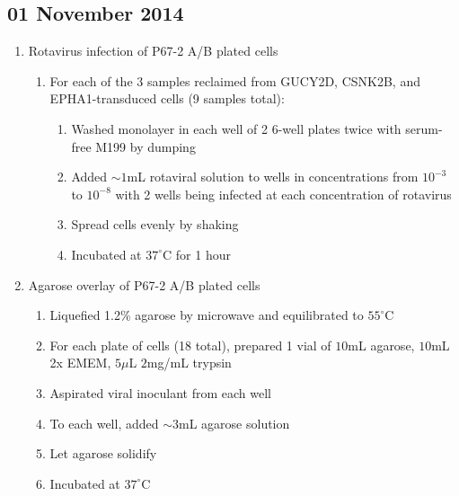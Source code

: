 \subsection*{01 November 2014}

\begin{enumerate}
	\item Rotavirus infection of P67-2 A/B plated cells
		\begin{enumerate}
			\item For each of the 3 samples reclaimed from GUCY2D, CSNK2B, and EPHA1-transduced cells (9 samples total):
				\begin{enumerate}
					\item Washed monolayer in each well of 2 6-well plates twice with serum-free M199 by dumping
					\item Added $\sim 1$mL rotaviral solution to wells in concentrations from $10^{-3}$ to $10^{-8}$ with 2 wells being infected at each concentration of rotavirus
					\item Spread cells evenly by shaking
					\item Incubated at $37^{\circ}$C for 1 hour
				\end{enumerate}
		\end{enumerate}
	\item Agarose overlay of P67-2 A/B plated cells
		\begin{enumerate}
			\item Liquefied 1.2\% agarose by microwave and equilibrated to $55^{\circ}$C
			\item For each plate of cells (18 total), prepared 1 vial of $10$mL agarose, $10$mL 2x EMEM, $5\mu$L $2$mg/mL trypsin
			\item Aspirated viral inoculant from each well
			\item To each well, added $\sim 3$mL agarose solution
			\item Let agarose solidify
			\item Incubated at $37^{\circ}$C
		\end{enumerate}
\end{enumerate}